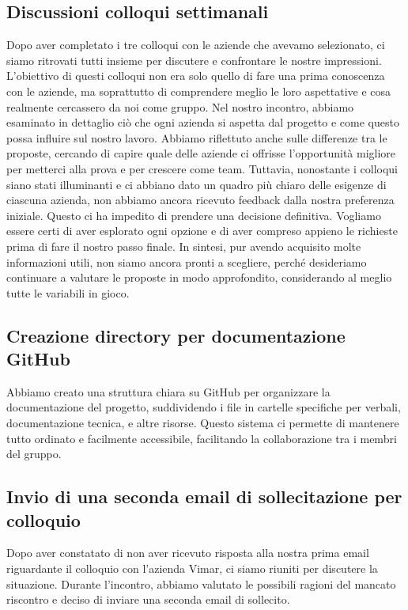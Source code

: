 \documentclass{article}
\begin{document}
\subsection{Discussioni colloqui settimanali}
{\large
Dopo aver completato i tre colloqui con le aziende che avevamo selezionato, ci siamo ritrovati tutti insieme per discutere e confrontare le nostre impressioni. L'obiettivo di questi colloqui non era solo quello di fare una prima conoscenza con le aziende, ma soprattutto di comprendere meglio le loro aspettative e cosa realmente cercassero da noi come gruppo. \newline
Nel nostro incontro, abbiamo esaminato in dettaglio ciò che ogni azienda si aspetta dal progetto e come questo possa influire sul nostro lavoro. Abbiamo riflettuto anche sulle differenze tra le proposte, cercando di capire quale delle aziende ci offrisse l'opportunità migliore per metterci alla prova e per crescere come team.\newline
Tuttavia, nonostante i colloqui siano stati illuminanti e ci abbiano dato un quadro più chiaro delle esigenze di ciascuna azienda, non abbiamo ancora ricevuto feedback dalla nostra preferenza iniziale. Questo ci ha impedito di prendere una decisione definitiva. Vogliamo essere certi di aver esplorato ogni opzione e di aver compreso appieno le richieste prima di fare il nostro passo finale.\newline
In sintesi, pur avendo acquisito molte informazioni utili, non siamo ancora pronti a scegliere, perché desideriamo continuare a valutare le proposte in modo approfondito, considerando al meglio tutte le variabili in gioco. }
\subsection{Creazione directory per documentazione GitHub}
{\large
Abbiamo creato una struttura chiara su GitHub per organizzare la documentazione del progetto, suddividendo i file in cartelle specifiche per verbali, documentazione tecnica, e altre risorse. Questo sistema ci permette di mantenere tutto ordinato e facilmente accessibile, facilitando la collaborazione tra i membri del gruppo. }
\subsection{Invio di una seconda email di sollecitazione per colloquio}
{\large
Dopo aver constatato di non aver ricevuto risposta alla nostra prima email riguardante il colloquio con l'azienda Vimar, ci siamo riuniti per discutere la situazione. Durante l'incontro, abbiamo valutato le possibili ragioni del mancato riscontro e deciso di inviare una seconda email di sollecito. }
\end{document}
